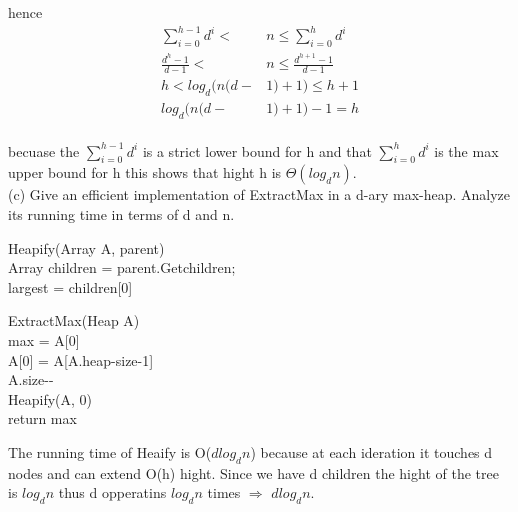 \documentclass[12pt]{article}
\begin{document}
 	hence
 	\begin{align*}
 	\sum_{i=0}^{h-1}d^i <& n \leq 	\sum_{i=0}^{h}d^i \\
 \frac{d^{h}-1}{d-1} < &n \leq \frac{d^{h+1}-1}{d-1} \\
 h < log_d(n(d-&1)+1) \leq h+1 \\
 	log_d(n(d-&1)+1)-1 = h  \\
 	\end{align*}
 	
 	becuase the $\sum_{i=0}^{h-1}d^i$ is a strict lower bound for h and that $\sum_{i=0}^{h}d^i$ is the max upper bound for h this shows that hight h is  $\Theta(log_dn)$.\\
 	

(c) Give an efficient implementation of ExtractMax in a d-ary max-heap. Analyze its running time in terms of d and n.\\



\begin{algorithm}[H]
Heapify(Array A, parent)\\
Array children = parent.Getchildren;\\
largest = children[0]\\
\end{algorithm}

\begin{algorithm}[H]
ExtractMax(Heap A)\\
    max = A[0]\\
    A[0] = A[A.heap-size-1]\\
    A.size-{-}\\
    Heapify(A, 0)\\
    return max
\label{GETMAX} 
\end{algorithm}

The running time of Heaify is O($dlog_dn$) because at each ideration it touches d nodes and can extend O(h) hight. Since we have d children the hight of the tree is $log_dn$ thus d opperatins $log_dn$ times $\Rightarrow$ $dlog_dn$.\\
\end{document}
